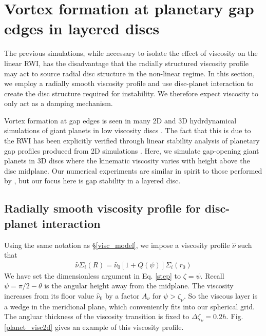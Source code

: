 \section{Vortex formation at planetary gap edges in layered
  discs}\label{disc-planet} 
The previous simulations, while necessary to isolate the effect of 
viscosity on the linear RWI, has the disadvantage that the radially
structured viscosity profile may act to source radial disc structure
in the non-linear regime. In this section, we employ a radially smooth
viscosity profile and use 
disc-planet interaction to
create the disc structure required for instability. We therefore expect viscosity to only
act as a damping mechanism. 

Vortex formation at gap edges is seen in many  
2D and 3D hydrdynamical simulations of giant planets in low viscosity discs 
\citep{valborro07,lin10,lin11a,lin12}. The fact that this is due to
the RWI has been explicitly verified through linear stability
analysis of planetary gap profiles produced from 2D simulations
\citep{valborro07,lin10}. Here, we simulate gap-opening giant planets
in 3D discs where the kinematic viscosity varies with height above the
disc midplane. Our numerical experiments are similar in spirit to
those performed by \cite{pierens10}, but our focus here is gap
stability in a layered disc. 
 
\subsection{Radially smooth viscosity profile for disc-planet
  interaction}\label{planet_visc_mode} 
Using the same notation as \S\ref{visc_model}, we impose a viscosity
profile $\hat{\nu}$ such that 
\begin{align}\label{planet_visc_profile}
  \hat{\nu}\Sigma_i(R)=
  \hat{\nu}_0\left[1+Q(\psi)\right]\Sigma_i(r_0)   
\end{align}
We have set the dimensionless argument in Eq. \ref{step} to
$\zeta=\psi$. Recall $\psi=\pi/2-\theta$ is the angular height away from the midplane. 
The viscosity increases from its floor value $\hat{\nu}_0$ by a factor
$A_\nu$ for $\psi > \zeta_\nu$. So the viscous layer is 
a wedge in the meridional plane, which conveniently fits into our
spherical grid. %
The angluar thickness of the viscosity
transition is fixed to $\Delta\zeta_\nu =
0.2h$. Fig. \ref{planet_visc2d} gives an example of this  
viscosity profile. 

